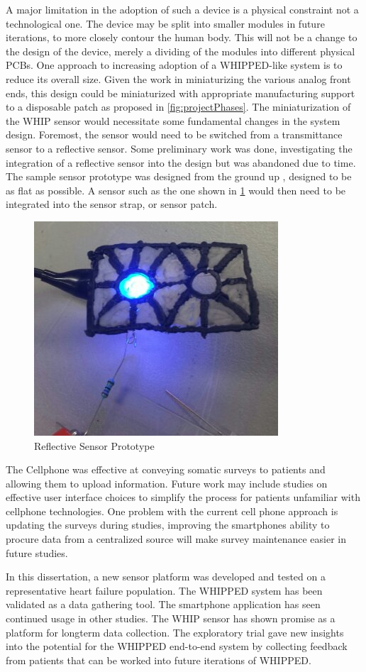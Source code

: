 A major limitation in the adoption of such a device is a physical constraint not a technological one. The device may be split into smaller modules in future iterations, to more closely contour the human body. This will not be a change to the design of the device, merely a dividing of the modules into different physical PCBs. One approach to increasing adoption of a WHIPPED-like system is to reduce its overall size. Given the work in miniaturizing the various analog front ends\cite{AFE4490,ADS1293}, this design could be miniaturized with appropriate manufacturing support to a disposable patch as proposed in \cref{fig:projectPhases}. The miniaturization of the WHIP sensor would necessitate some fundamental changes in the system design. Foremost, the  sensor would need to be switched from a transmittance sensor to a reflective sensor. Some preliminary work was done, investigating the integration of a reflective sensor into the design but was abandoned due to time. The sample sensor prototype was designed from the ground up , designed to be as flat as possible. A sensor such as the one shown in  \cref{fig:ReflectiveSensorPrototypes} would then need to be integrated into the sensor strap, or sensor patch.

\begin{figure}
\centering
\includegraphics[width=0.5\linewidth]{Images/ReflectiveSensorPrototype.png}
\caption{Reflective Sensor Prototype }
\label{fig:ReflectiveSensorPrototypes}
\end{figure}


The Cellphone was effective at conveying somatic surveys to patients and allowing them to upload information. Future work may include studies on effective user interface choices to simplify the process for patients unfamiliar with cellphone technologies. One problem with the current cell phone approach is updating the surveys during studies, improving the smartphones ability to procure data from a centralized source will make survey maintenance easier in future studies.

In this dissertation, a new sensor platform was developed and tested on a representative heart failure population. The WHIPPED system has been validated as a data gathering tool. The smartphone application has seen continued usage in other studies. The WHIP sensor has shown promise as a platform for longterm data collection. The exploratory trial gave new insights into the potential for the WHIPPED end-to-end system by collecting feedback from patients that can be worked into future iterations of WHIPPED.

